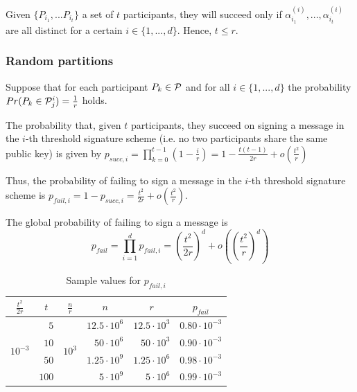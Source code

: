 Given $\{P_{i_1}, ... P_{i_t} \}$ a set of $t$ participants, they will succeed only if $\alpha^{(i)}_{i_1}, ..., \alpha^{(i)}_{i_t} $ are all distinct for a certain $i \in \{1, ...,d\}$. Hence, $t \leq r$.

\subsubsection*{Random partitions}
Suppose that for each participant $P_k \in {\mathcal P}$ and for all $i \in \{1, ..., d\}$ the probability $Pr(P_k \in {\mathcal P}^i_j) = \frac{1}{r}$ holds.

The probability that, given $t$ participants, they succeed on signing a message in the $i$-th threshold signature scheme (i.e. no two participants share the same public key) is given by $p_{succ,i} = \prod_{k=0}^{t-1} (1-\frac{i}{r}) = 1 - \frac{t(t-1)}{2r} + o\left( \frac{t^2}{r} \right)$

Thus, the probability of failing to sign a message in the $i$-th threshold signature scheme is $p_{fail,i} = 1 - p_{succ,i} = \frac{t^2}{2r} + o\left( \frac{t^2}{r} \right)$.

The global probability of failing to sign a message is $$p_{fail} = \prod_{i=1}^d p_{fail,i} = {\left(\frac{t^2}{2r}\right)^d + o\left( \left( \frac{t^{2}}{r} \right)^d \right)}$$

\begin{table}[H]
\begin{center}
    \begin{tabular}{|c|r|c|r|r|c|}
        \hline
        $\frac{t^2}{2r}$ & \multicolumn{1}{c|}{$t$} & $\frac{n}{r}$ & \multicolumn{1}{c|}{$n$} & \multicolumn{1}{c|}{$r$} & $p_{fail}$ \\ \hline
        
        \multirow{4}{*}{$10^{-3}$} & $5$ & \multirow{4}{*}{$10^{3}$} & $12.5 \cdot 10^6$ & $12.5 \cdot 10^{3}$ & $0.80 \cdot 10^{-3}$ \\ \cline{2-2} \cline{4-6}
        & $10$ & & $50 \cdot 10^6$ & $50 \cdot 10^{3}$ & $0.90 \cdot 10^{-3}$ \\ \cline{2-2} \cline{4-6}
        & $50$ & & $1.25 \cdot 10^9$ & $1.25 \cdot 10^{6}$ & $0.98 \cdot 10^{-3}$ \\ \cline{2-2} \cline{4-6}
        & $100$ & & $5 \cdot 10^9$ & $5 \cdot 10^{6}$ & $0.99 \cdot 10^{-3}$ \\ \cline{2-2} \cline{4-6}
        
        \hline

    \end{tabular}
\end{center}
\caption{Sample values for $p_{fail,i}$}
\end{table}


